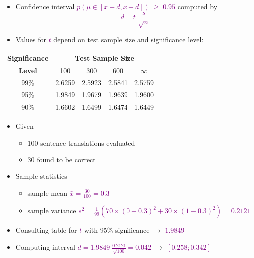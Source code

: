 \documentclass[landscape]{slides}
\newcommand{\maths}[1]{\textcolor{purple}{#1}}
\begin{document}

\vspace{10mm}
\begin{itemize}
\item Confidence interval \maths{$p(\mu \in [\bar{x}-d,\bar{x}+d]) \; \geq \; 0.95$} computed by
\maths{\begin{equation*}
d = t \; \frac{s}{\sqrt{n}} 
\end{equation*}}
\item Values for \maths{$t$} depend on test sample size and significance level:
\end{itemize}
\begin{center}
{\small \begin{tabular}{|c|c|c|c|c|c|} \hline
{\bf Significance} & \multicolumn{4}{c|}{\bf Test Sample Size} \\ \cline{2-5} 
{\bf Level}      & 100    & 300    & 600    & $\infty$ \\ \hline
99\%  & 2.6259 & 2.5923 & 2.5841 & 2.5759 \\ \hline
95\%  & 1.9849 & 1.9679 & 1.9639 & 1.9600 \\ \hline
90\%  & 1.6602 & 1.6499 & 1.6474 & 1.6449 \\ \hline
\end{tabular} }
\end{center}


\vspace{10mm}
\begin{itemize}
\item Given
\begin{itemize}
\item 100 sentence translations evaluated
\item 30 found to be correct
\end{itemize}
\item Sample statistics
\begin{itemize}
\item sample mean \maths{$\bar{x} = \frac{30}{100} = 0.3$}
\item sample variance \maths{$s^2 = \frac{1}{99} (70\times(0-0.3)^2 + 30\times(1-0.3)^2) = 0.2121$}
\end{itemize}
\item Consulting table for \maths{$t$} with 95\% significance $\rightarrow$ \maths{$1.9849$}
\item Computing interval \maths{$d =  1.9849 \; \frac{0.2121}{\sqrt{100}} = 0.042$} $\rightarrow$ \maths{$[0.258;0.342]$}
\end{itemize}
\end{document}
